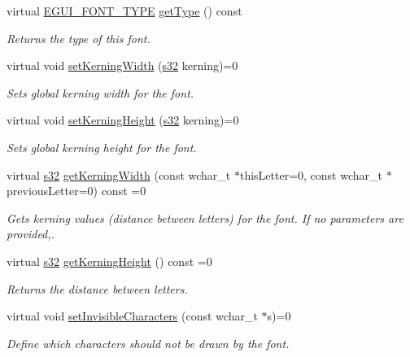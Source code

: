 \begin{DoxyCompactItemize}
virtual \hyperlink{namespaceirr_1_1gui_a3c818a164486f43300260327c5420a2f}{E\+G\+U\+I\+\_\+\+F\+O\+N\+T\+\_\+\+T\+Y\+PE} \hyperlink{classirr_1_1gui_1_1IGUIFont_a3d5a42997a718b510b73e7d6235b993e}{get\+Type} () const
\begin{DoxyCompactList}\small\item\em Returns the type of this font. \end{DoxyCompactList}\item 
\mbox{\label{classirr_1_1gui_1_1IGUIFont_aa683bb2535776b7f81adc050931d9b17}} 
virtual void \hyperlink{classirr_1_1gui_1_1IGUIFont_aa683bb2535776b7f81adc050931d9b17}{set\+Kerning\+Width} (\hyperlink{namespaceirr_ac66849b7a6ed16e30ebede579f9b47c6}{s32} kerning)=0
\begin{DoxyCompactList}\small\item\em Sets global kerning width for the font. \end{DoxyCompactList}\item 
\mbox{\label{classirr_1_1gui_1_1IGUIFont_a9545ecfae06592acd47508f6824bb386}} 
virtual void \hyperlink{classirr_1_1gui_1_1IGUIFont_a9545ecfae06592acd47508f6824bb386}{set\+Kerning\+Height} (\hyperlink{namespaceirr_ac66849b7a6ed16e30ebede579f9b47c6}{s32} kerning)=0
\begin{DoxyCompactList}\small\item\em Sets global kerning height for the font. \end{DoxyCompactList}\item 
virtual \hyperlink{namespaceirr_ac66849b7a6ed16e30ebede579f9b47c6}{s32} \hyperlink{classirr_1_1gui_1_1IGUIFont_a7de0b25d3d1dbdcc9036e5d788e2d9ab}{get\+Kerning\+Width} (const wchar\+\_\+t $\ast$this\+Letter=0, const wchar\+\_\+t $\ast$previous\+Letter=0) const =0
\begin{DoxyCompactList}\small\item\em Gets kerning values (distance between letters) for the font. If no parameters are provided,. \end{DoxyCompactList}\item 
\mbox{\label{classirr_1_1gui_1_1IGUIFont_a1f1a760be155fc0f6a632b457154a5d8}} 
virtual \hyperlink{namespaceirr_ac66849b7a6ed16e30ebede579f9b47c6}{s32} \hyperlink{classirr_1_1gui_1_1IGUIFont_a1f1a760be155fc0f6a632b457154a5d8}{get\+Kerning\+Height} () const =0
\begin{DoxyCompactList}\small\item\em Returns the distance between letters. \end{DoxyCompactList}\item 
virtual void \hyperlink{classirr_1_1gui_1_1IGUIFont_acff05412dc954845add611c5f71cef49}{set\+Invisible\+Characters} (const wchar\+\_\+t $\ast$s)=0
\begin{DoxyCompactList}\small\item\em Define which characters should not be drawn by the font. \end{DoxyCompactList}\end{DoxyCompactItemize}
